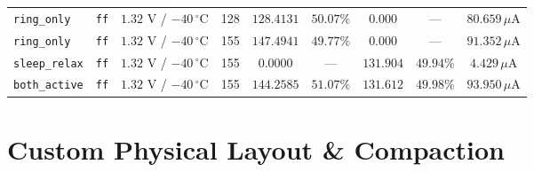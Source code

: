 \documentclass[10pt,a4paper]{article}
\begin{document}
\begin{table}[H]
\begin{tabular}{@{}lllcccccc@{}}
\texttt{ring\_only} & \texttt{ff} & $1.32\text{ V}$ / $-40\,^\circ\text{C}$ & 128 & $128.4131$ & $50.07\%$ & $0.000$ & --- & $80.659\,\mu\text{A}$ \\
\texttt{ring\_only} & \texttt{ff} & $1.32\text{ V}$ / $-40\,^\circ\text{C}$ & 155 & $147.4941$ & $49.77\%$ & $0.000$ & --- & $91.352\,\mu\text{A}$ \\
\texttt{sleep\_relax} & \texttt{ff} & $1.32\text{ V}$ / $-40\,^\circ\text{C}$ & 155 & $0.0000$ & --- & $131.904$ & $49.94\%$ & $4.429\,\mu\text{A}$ \\
\texttt{both\_active} & \texttt{ff} & $1.32\text{ V}$ / $-40\,^\circ\text{C}$ & 155 & $144.2585$ & $51.07\%$ & $131.612$ & $49.98\%$ & $93.950\,\mu\text{A}$ \\
\bottomrule
\end{tabular}
\end{table}

\section{Custom Physical Layout \& Compaction}
\end{document}
